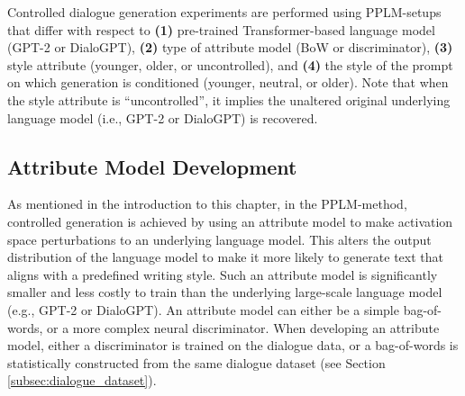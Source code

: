 

Controlled dialogue generation experiments are performed using PPLM-setups that differ with respect to \textbf{(1)} pre-trained Transformer-based language model (GPT-2 or DialoGPT), \textbf{(2)} type of attribute model (BoW or discriminator), \textbf{(3)} style attribute (younger, older, or uncontrolled), and \textbf{(4)} the style of the prompt on which generation is conditioned (younger, neutral, or older). Note that when the style attribute is ``uncontrolled'', it implies the unaltered original underlying language model (i.e., GPT-2 or DialoGPT) is recovered. 




\subsection{Attribute Model Development}
\label{subsec:att_model_dev}
As mentioned in the introduction to this chapter, in the PPLM-method, controlled generation is achieved by using an attribute model to make activation space perturbations to an underlying language model. This alters the output distribution of the language model to make it more likely to generate text that aligns with a predefined writing style. Such an attribute model is significantly smaller and less costly to train than the underlying large-scale language model (e.g., GPT-2 or DialoGPT). An attribute model can either be a simple bag-of-words, or a more complex neural discriminator. When developing an attribute model, either a discriminator is trained on the dialogue data, or a bag-of-words is statistically constructed from the same dialogue dataset (see Section \ref{subsec:dialogue_dataset}).


